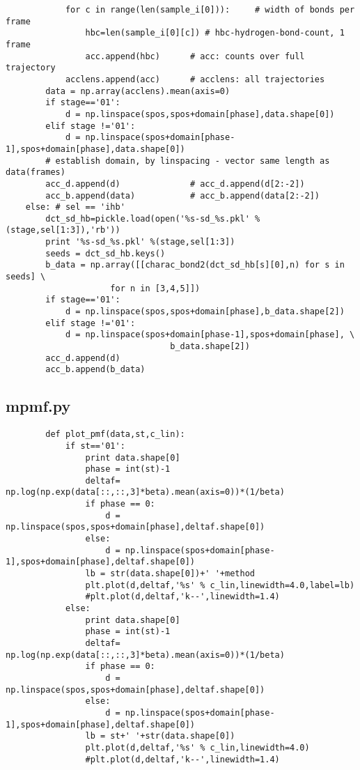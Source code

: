 \documentclass[11pt]{article}
\begin{document}
\begin{verbatim}
            for c in range(len(sample_i[0])):     # width of bonds per frame
                hbc=len(sample_i[0][c]) # hbc-hydrogen-bond-count, 1 frame
                acc.append(hbc)      # acc: counts over full trajectory
            acclens.append(acc)      # acclens: all trajectories
        data = np.array(acclens).mean(axis=0)
        if stage=='01':
            d = np.linspace(spos,spos+domain[phase],data.shape[0])
        elif stage !='01':
            d = np.linspace(spos+domain[phase-1],spos+domain[phase],data.shape[0])
        # establish domain, by linspacing - vector same length as data(frames)
        acc_d.append(d)              # acc_d.append(d[2:-2])
        acc_b.append(data)           # acc_b.append(data[2:-2])
    else: # sel == 'ihb'
        dct_sd_hb=pickle.load(open('%s-sd_%s.pkl' % (stage,sel[1:3]),'rb'))
        print '%s-sd_%s.pkl' %(stage,sel[1:3])
        seeds = dct_sd_hb.keys()
        b_data = np.array([[charac_bond2(dct_sd_hb[s][0],n) for s in seeds] \
                     for n in [3,4,5]])
        if stage=='01':
            d = np.linspace(spos,spos+domain[phase],b_data.shape[2])
        elif stage !='01':
            d = np.linspace(spos+domain[phase-1],spos+domain[phase], \
                                 b_data.shape[2])
        acc_d.append(d)
        acc_b.append(b_data)
\end{verbatim}


\subsection{mpmf.py}
\begin{verbatim}
        def plot_pmf(data,st,c_lin):
            if st=='01':
                print data.shape[0]
                phase = int(st)-1
                deltaf= np.log(np.exp(data[::,::,3]*beta).mean(axis=0))*(1/beta)
                if phase == 0:
                    d = np.linspace(spos,spos+domain[phase],deltaf.shape[0])
                else:
                    d = np.linspace(spos+domain[phase-1],spos+domain[phase],deltaf.shape[0])
                lb = str(data.shape[0])+' '+method
                plt.plot(d,deltaf,'%s' % c_lin,linewidth=4.0,label=lb)
                #plt.plot(d,deltaf,'k--',linewidth=1.4)
            else:
                print data.shape[0]
                phase = int(st)-1
                deltaf= np.log(np.exp(data[::,::,3]*beta).mean(axis=0))*(1/beta)
                if phase == 0:
                    d = np.linspace(spos,spos+domain[phase],deltaf.shape[0])
                else:
                    d = np.linspace(spos+domain[phase-1],spos+domain[phase],deltaf.shape[0])
                lb = st+' '+str(data.shape[0])
                plt.plot(d,deltaf,'%s' % c_lin,linewidth=4.0)
                #plt.plot(d,deltaf,'k--',linewidth=1.4)
\end{verbatim}
\end{document}
